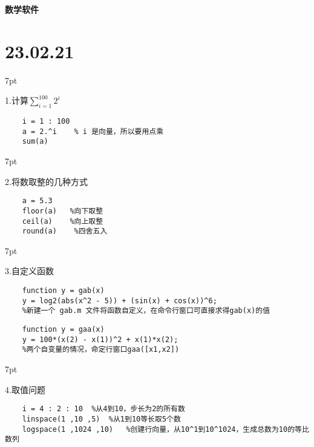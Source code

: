 \documentclass{article} %
\newenvironment{eg}{%
\def\FrameCommand{%
\hspace{1pt}%
{\color{Gray}\vrule width 2pt}%
{\color{egshade}\vrule width 4pt}%
\colorbox{egshade}%
}%
\MakeFramed{\advance\hsize-\width\FrameRestore}%
\noindent\hspace{-4.55pt}%
\begin{adjustwidth}{}{7pt}%
\vspace{2pt}\vspace{2pt}%
\normalfont %
}
{%
\vspace{2pt}\end{adjustwidth}\endMakeFramed%
}
\begin{document}
 
\centerline{\LARGE \textbf{数学软件} }\par 

\noindent \Large \section*{23.02.21} \par \normalsize
\begin{eg}
    1.计算$\sum \limits _{i=1}^{100} 2^{i}$ \par
\end{eg}
\begin{lstlisting}
    i = 1 : 100
    a = 2.^i    % i 是向量，所以要用点乘
    sum(a)
\end{lstlisting}


\begin{eg}
    2.将数取整的几种方式
\end{eg}
\begin{lstlisting}
    a = 5.3
    floor(a)   %向下取整
    ceil(a)    %向上取整
    round(a)    %四舍五入
\end{lstlisting}

\begin{eg}
    3.自定义函数
\end{eg}
\begin{lstlisting}
    function y = gab(x)
    y = log2(abs(x^2 - 5)) + (sin(x) + cos(x))^6; 
    %新建一个 gab.m 文件将函数自定义，在命令行窗口可直接求得gab(x)的值
\end{lstlisting}
\begin{lstlisting}
    function y = gaa(x)
    y = 100*(x(2) - x(1))^2 + x(1)*x(2);
    %两个自变量的情况，命定行窗口gaa([x1,x2])
\end{lstlisting}

\begin{eg}
    4.取值问题
\end{eg}
\begin{lstlisting}
    i = 4 : 2 : 10  %从4到10，步长为2的所有数
    linspace(1 ,10 ,5)  %从1到10等长取5个数
    logspace(1 ,1024 ,10)   %创建行向量，从10^1到10^1024，生成总数为10的等比数列
\end{lstlisting}
\end{document}
